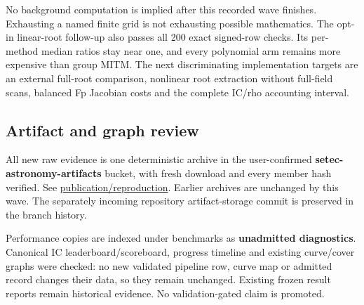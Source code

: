 \documentclass[
  10pt,
]{article}
\begin{document}
No background computation is implied after this recorded wave finishes.
Exhausting a named finite grid is not exhausting possible mathematics.
The opt-in linear-root follow-up also passes all 200 exact signed-row
checks. Its per-method median ratios stay near one, and every polynomial
arm remains more expensive than group MITM. The next discriminating
implementation targets are an external full-root comparison, nonlinear
root extraction without full-field scans, balanced Fp Jacobian costs and
the complete IC/rho accounting interval.

\subsection{Artifact and graph review}\label{artifact-and-graph-review}

All new raw evidence is one deterministic archive in the user-confirmed
\textbf{setec-astronomy-artifacts} bucket, with fresh download and every
member hash verified. See
\href{../../execution-v3/continue-20261026/README.md}{publication/reproduction}.
Earlier archives are unchanged by this wave. The separately incoming
repository artifact-storage commit is preserved in the branch history.

Performance copies are indexed under benchmarks as \textbf{unadmitted
diagnostics}. Canonical IC leaderboard/scoreboard, progress timeline and
existing curve/cover graphs were checked: no new validated pipeline row,
curve map or admitted record changes their data, so they remain
unchanged. Existing frozen result reports remain historical evidence. No
validation-gated claim is promoted.
\end{document}
